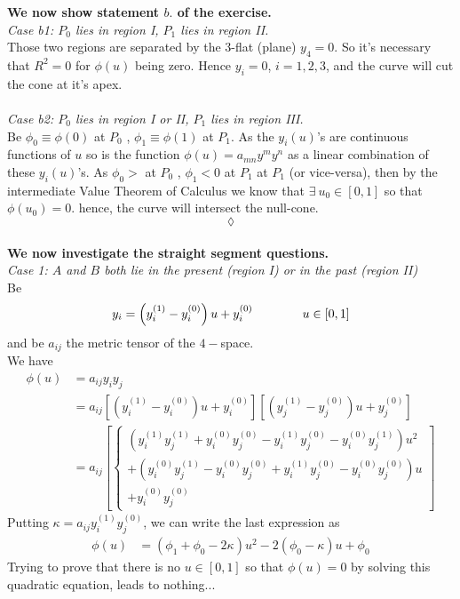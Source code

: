 \textbf{We now show statement $\mathit{b.}$ of the exercise.}\\

\textit{Case b1: $P_0$ lies in region I, $P_1$  lies in region II.} \\
Those two regions are separated by the $3$-flat (plane) $y_4=0$. So it's necessary that $R^2=0$ for $\phi(u)$ being zero. Hence $y_i=0$, $  i=1,2,3$, and the curve will cut the cone at it's apex.
\\\\
\textit{Case b2: $P_0$ lies in region I or II, $P_1$  lies in region III.} \\
Be $\phi_0\equiv \phi(0)$ at $P_0$  , $\phi_1\equiv \phi(1)$ at $P_1$. As the $y_i(u)$'s are continuous functions of $u$ so is the function $\phi(u) = a_{mn}y^my^n$ as a  linear combination of these $y_i(u)$'s. As $\phi_0> $ at $P_0$  , $\phi_1<0$ at $P_1$ at $P_1$ (or vice-versa), then by the intermediate Value Theorem of Calculus we know that $\exists  \  u_0 \in \left[0,1\right]$ so that  $\phi(u_0)=0$. hence, the curve will intersect the null-cone.
$$\lozenge$$\\


\textbf{We now investigate the straight segment questions.} \\
\textit{Case 1: $A$ and $B$ both lie in the present (region I) or in the past (region II)}\\
Be $$y_i = \left(y_i^{(1)}-y_i^{(0)}\right)u+ y_i^{(0)}\quad\quad\quad\quad u\in [0,1]$$ and be $a_{ij}$ the metric tensor of the  $4-$space.\\
We have
\begin{align*}
\phi(u)&= a_{ij}y_iy_j\\
&= a_{ij}\left[\left(y_i^{(1)}-y_i^{(0)}\right)u+ y_i^{(0)}\right]\left[\left(y_j^{(1)}-y_j^{(0)}\right)u+ y_j^{(0)}\right]\\
&= a_{ij}\left[\left\{\begin{matrix}\left(y_i^{(1)}y_j^{(1)}+y_i^{(0)}y_j^{(0)}-y_i^{(1)}y_j^{(0)}-y_i^{(0)}y_j^{(1)}\right)u^2\\
+ \left(y_i^{(0)}y_j^{(1)}-y_i^{(0)}y_j^{(0)}+y_i^{(1)}y_j^{(0)}-y_i^{(0)}y_j^{(0)}\right)u\\
+y_i^{(0)}y_j^{(0)}\end{matrix}\right.\right]
\end{align*}
Putting $\kappa = a_{ij}y_i^{(1)}y_j^{(0)}$, we can write the last expression as 
\begin{align}
\phi(u)&= \left(\phi_1+\phi_0-2\kappa\right)u^2 -2\left(\phi_0-\kappa\right)u+\phi_0
\end{align}
Trying to prove that there is no $u\in [0,1]$ so that $\phi(u)=0$ by solving this quadratic equation, leads to nothing...

